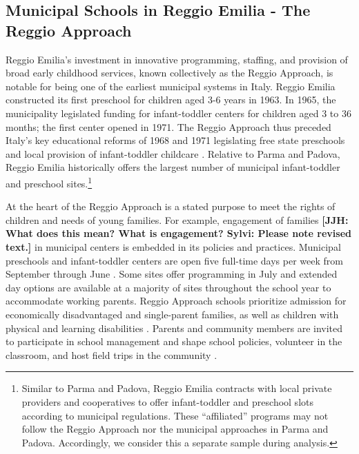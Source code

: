
\subsection{Municipal Schools in Reggio Emilia - The Reggio Approach}

Reggio Emilia's investment in innovative programming, staffing, and provision of broad early childhood services, known collectively as the Reggio Approach, is notable for being one of the earliest municipal systems in Italy. Reggio Emilia constructed its first preschool for children aged 3-6 years in 1963. In 1965, the municipality legislated funding for infant-toddler centers for children aged 3 to 36 months; the first center opened in 1971. The Reggio Approach thus preceded Italy's key educational reforms of 1968 and 1971 legislating free state preschools and local provision of infant-toddler childcare \citep{Cagliari-etal-eds_2016_BOOK_Loris-Malaguzzi}. Relative to Parma and Padova, Reggio Emilia historically offers the largest number of municipal infant-toddler and preschool sites.\footnote{Similar to Parma and Padova, Reggio Emilia contracts with local private providers and cooperatives to offer infant-toddler and preschool slots according to municipal regulations. These ``affiliated'' programs may not follow the Reggio Approach nor the municipal approaches in Parma and Padova. Accordingly, we consider this a separate sample during analysis.} 

At the heart of the Reggio Approach is a stated purpose to meet the rights of children and needs of young families. For example, engagement of families \textbf{[JJH: What does this mean? What is engagement? Sylvi: Please note revised text.]} in municipal centers is embedded in its policies and practices. Municipal preschools and infant-toddler centers are open five full-time days per week from September through June \citep{Giudici-Nicolosi_2014_Reggio-Approach}. Some sites offer programming in July and extended day options are available at a majority of sites throughout the school year to accommodate working parents. Reggio Approach schools prioritize admission for economically disadvantaged and single-parent families, as well as children with physical and learning disabilities \citep{Edwards-etal-eds_1998_Hundred-Languages}. Parents and community members are invited to participate in school management and shape school policies, volunteer in the classroom, and host field trips in the community \citep{CEHD_2016_Historical-Analysis,Cagliari-etal-eds_2016_BOOK_Loris-Malaguzzi}.

